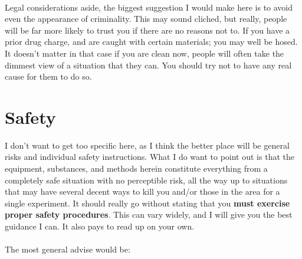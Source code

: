 \documentclass{book}
\begin{document}
\\
Legal considerations aside, the biggest suggestion I would make here is to avoid even the appearance of criminality.  This may sound cliched, but really, people will be far more likely to trust you if there are no reasons not to.  If you have a prior drug charge, and are caught with certain materials; you may well be hosed.  It doesn't matter in that case if you are clean now, people will often take the dimmest view of a situation that they can.  You should try not to have any real cause for them to do so.
\section{Safety}
I don't want to get too specific here, as I think the better place will be general risks and individual safety instructions.  What I do want to point out is that the equipment, substances, and methods herein constitute everything from a completely safe situation with no perceptible risk, all the way up to situations that may have several decent ways to kill you and/or those in the area for a single experiment.  It should really go without stating that you \textbf{must exercise proper safety procedures}.  This can vary widely, and I will give you the best guidance I can.  It also pays to read up on your own.\\
\\
The most general advise would be:\\
\end{document}
